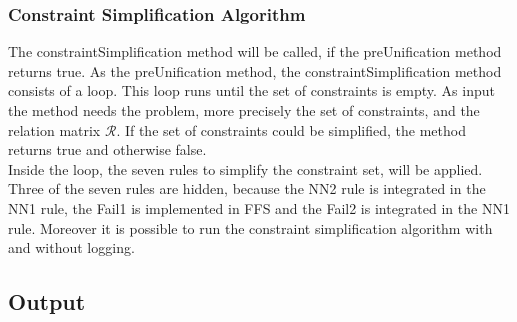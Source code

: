 \documentclass{article}
\begin{document}

\subsubsection{Constraint Simplification Algorithm}
The constraintSimplification method will be called, if the preUnification method returns true. As the preUnification method, the constraintSimplification method consists of a loop. This loop runs until the set of constraints is empty. As input the method needs the problem, more precisely the set of constraints, and the relation matrix \(\mathcal{R}\). If the set of constraints could be simplified, the method returns true and otherwise false.\\
Inside the loop, the seven rules to simplify the constraint set, will be applied. Three of the seven rules are hidden, because the NN2 rule is integrated in the NN1 rule, the Fail1 is implemented in FFS and the Fail2 is integrated in the NN1 rule. Moreover it is possible to run the constraint simplification algorithm with and without logging. 


\subsection{Output}
\end{document}
